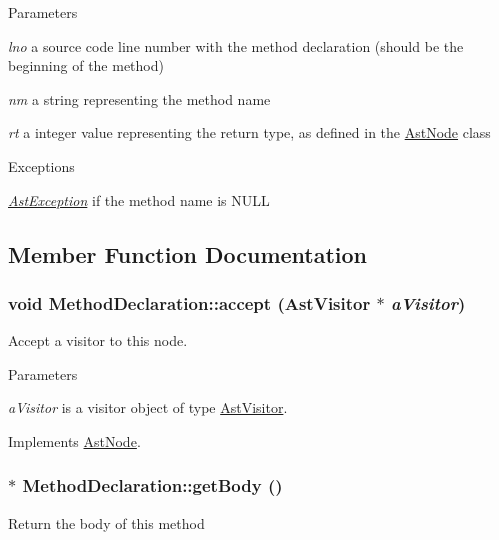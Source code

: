 \begin{DoxyParams}{Parameters}
\item[{\em lno}]a source code line number with the method declaration (should be the beginning of the method) \item[{\em nm}]a string representing the method name \item[{\em rt}]a integer value representing the return type, as defined in the \hyperlink{classAstNode}{AstNode} class \end{DoxyParams}

\begin{DoxyExceptions}{Exceptions}
\item[{\em \hyperlink{classAstException}{AstException}}]if the method name is NULL \end{DoxyExceptions}


\subsection{Member Function Documentation}
\hypertarget{classMethodDeclaration_af4989b6bfa1fdc87be33f4315aa54a7e}{
\subsubsection[{accept}]{\setlength{\rightskip}{0pt plus 5cm}void MethodDeclaration::accept ({\bf AstVisitor} $\ast$ {\em aVisitor})}}
\label{classMethodDeclaration_af4989b6bfa1fdc87be33f4315aa54a7e}
Accept a visitor to this node. 
\begin{DoxyParams}{Parameters}
\item[{\em aVisitor}]is a visitor object of type \hyperlink{classAstVisitor}{AstVisitor}. \end{DoxyParams}


Implements \hyperlink{classAstNode_a67b2d6ce1262da2954fb4db255759fb3}{AstNode}.\hypertarget{classMethodDeclaration_a7c7b3d34df4197370caca80119f19c0f}{
\subsubsection[{getBody}]{$\ast$ MethodDeclaration::getBody ()}}
\label{classMethodDeclaration_a7c7b3d34df4197370caca80119f19c0f}
Return the body of this method

